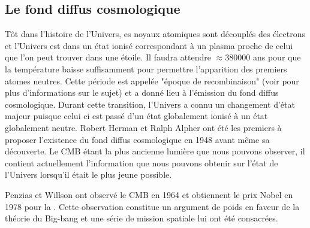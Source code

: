 \subsection{Le fond diffus cosmologique}
\label{sec:CMB}

Tôt dans l'histoire de l'Univers, es noyaux atomiques sont découplés des électrons et l'Univers est dans un état ionisé correspondant à un plasma proche de celui que l'on peut trouver dans une étoile.
Il faudra attendre $\approx 380 000$ ans pour que la température baisse suffisamment pour permettre l'apparition des premiers atomes neutres.
Cette période est appelée "époque de recombinaison" (voir \cite{2009AN....330..657S} pour plus d'informations sur le sujet) et a donné lieu à l'émission du fond diffus cosmologique.
Durant cette transition, l'Univers a connu un changement d'état majeur puisque celui ci est passé d'un état globalement ionisé à un état globalement neutre.
Robert Herman et Ralph Alpher ont été les premiers à proposer l’existence du fond diffus cosmologique en 1948 avant même sa découverte.
Le \ac{CMB} étant la plus ancienne lumière que nous pouvons observer, il contient actuellement l'information que nous pouvons obtenir sur l'état de l'Univers lorsqu'il était le plus jeune possible.
%
%

Penzias et Willson ont observé le \ac{CMB} en 1964 et obtiennent le prix Nobel en 1978 pour la \cite{PenziasWilsonNobel}.
Cette observation constitue un argument de poids en faveur de la théorie du Big-bang et une série de mission spatiale lui ont été consacrées.

